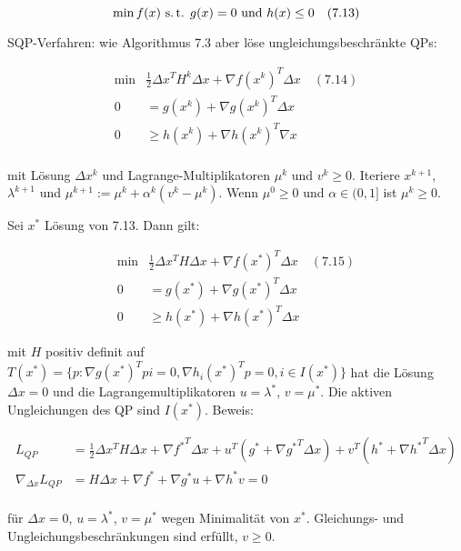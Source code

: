 
\[ \min f(x) \text{ s.\,t. } g(x) = 0 \text{ und } h(x) \leq 0 \quad (7.13) \]

SQP-Verfahren: wie Algorithmus 7.3 aber löse ungleichungsbeschränkte QPs:

\begin{align*}
\min &\frac 12 \Delta x^T H^k \Delta x + \nabla f(x^k)^T \Delta x  \quad (7.14) \\
0 &= g(x^k) + \nabla g(x^k)^T \Delta x \\
0 & \geq h(x^k) + \nabla h(x^k)^T \nabla x \\
\end{align*}

mit Lösung $\Delta x^k$ und Lagrange-Multiplikatoren $\mu^k$ und $v^k \geq 0$. Iteriere $x^{k+1}$, $\lambda^{k+1}$ und $\mu^{k+1} := \mu^k + \alpha^k (v^k - \mu^k)$. Wenn $\mu^0 \geq 0$ und $\alpha \in (0,1]$ ist $\mu^k \geq 0$.



Sei $x^*$ Lösung von 7.13. Dann gilt:

\begin{align*}
\min &\frac 12 \Delta x^T H \Delta x + \nabla f(x^*)^T \Delta x \quad (7.15)\\
0 &= g(x^*) + \nabla g(x^*)^T \Delta x \\
0 & \geq h(x^*) + \nabla h(x^*)^T \Delta x
\end{align*}

mit $H$ positiv definit auf $T(x^*) = \{ p: \nabla g(x^*)^T pi = 0, \nabla h_i (x^*)^T p = 0, i \in I(x^*) \}$ hat die Lösung $\Delta x = 0$ und die Lagrangemultiplikatoren $u = \lambda^*$, $v = \mu^*$. Die aktiven Ungleichungen des QP sind $I(x^*)$. Beweis:

\begin{align*}
L_{QP} &= \frac 12 \Delta x^T H \Delta x + \nabla {f^*}^T \Delta x + u^T (g^* + \nabla {g^*}^T \Delta x) + v^T (h^* + \nabla {h^*}^T \Delta x) \\
\nabla_{\Delta x} L_{QP} &= H \Delta x + \nabla f^* + \nabla g^* u + \nabla h^* v = 0 \\
\end{align*}

für $\Delta x = 0$, $u = \lambda^*$, $v = \mu^*$ wegen Minimalität von $x^*$. Gleichungs- und Ungleichungsbeschränkungen sind erfüllt, $v \geq 0$.


